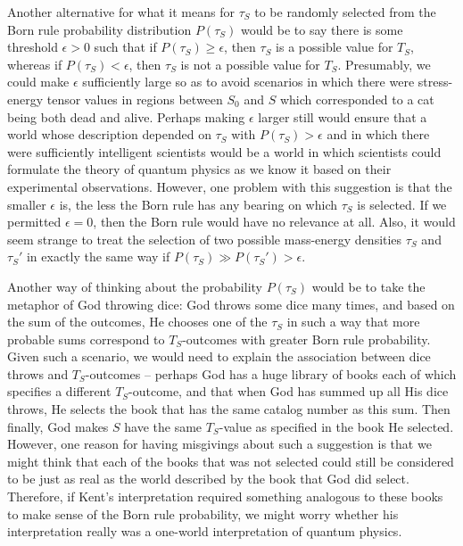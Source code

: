 Another alternative for what it means for $\tau_S$ to be randomly selected from the Born rule probability distribution $P(\tau_S)$ would be to say there is some threshold $\epsilon>0$ such that if $P(\tau_S)\geq\epsilon$, then $\tau_S$ is a possible value for $T_S$, whereas if $P(\tau_S)<\epsilon$, then  $\tau_S$ is not a possible value for $T_S$. Presumably, we could make $\epsilon$ sufficiently large so as to avoid scenarios in which there were stress-energy tensor values in regions between  $S_0$ and $S$ which corresponded to a cat being both dead and alive. Perhaps making $\epsilon$ larger still would ensure that a world whose description depended on $\tau_S$ with  $P(\tau_S)>\epsilon$ and in which there were sufficiently intelligent scientists would be a world in which scientists could formulate the theory of quantum physics as we know it based on their experimental observations. However, one problem with this suggestion is that the smaller $\epsilon$ is, the less the Born rule has any bearing on which $\tau_S$ is selected. If we permitted $\epsilon=0$, then the Born rule would have no relevance at all. Also, it would seem strange to treat the selection of two possible mass-energy densities $\tau_S$ and $\tau_S'$ in exactly the same way if $P(\tau_S)\gg P(\tau_S')>\epsilon$. 

Another way of thinking about the probability $P(\tau_S)$ would be to take the metaphor of God throwing dice: God throws some dice many times, and based on the sum of the outcomes, He chooses one of the $\tau_S$ in such a way that more probable sums correspond to $T_S$-outcomes with greater Born rule probability. Given such a scenario, we would need to explain the association between dice throws and $T_S$-outcomes -- perhaps God has a huge library of books each of which specifies a different $T_S$-outcome, and that when God  has summed up all His dice throws, He selects the book that has the same catalog number as this sum. Then finally, God makes $S$ have the same $T_S$-value as specified in the book He selected. However, one reason for having misgivings about such a suggestion is that we might think that each of the books that was not selected could still be considered to be just as real as the world described by the book that God did select. Therefore, if Kent's interpretation required something analogous to these books to make sense of the Born rule probability, we might worry whether his interpretation  really was a one-world interpretation of quantum physics. 

